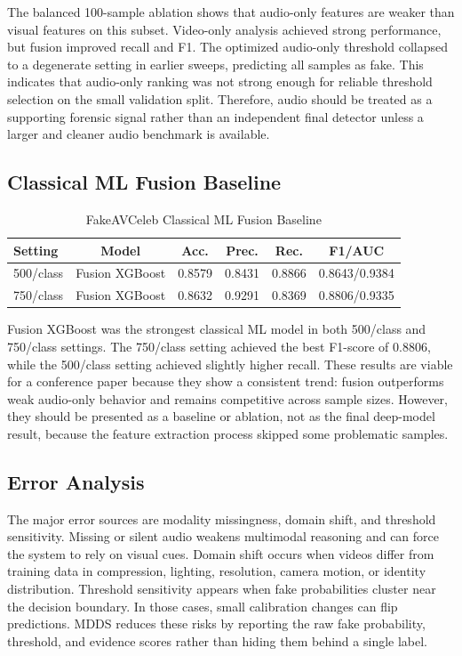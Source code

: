 \documentclass[conference]{IEEEtran}
\begin{document}
The balanced 100-sample ablation shows that audio-only features are weaker than visual features on this subset. Video-only analysis achieved strong performance, but fusion improved recall and F1. The optimized audio-only threshold collapsed to a degenerate setting in earlier sweeps, predicting all samples as fake. This indicates that audio-only ranking was not strong enough for reliable threshold selection on the small validation split. Therefore, audio should be treated as a supporting forensic signal rather than an independent final detector unless a larger and cleaner audio benchmark is available.

\subsection{Classical ML Fusion Baseline}
\begin{table}[htbp]
\caption{FakeAVCeleb Classical ML Fusion Baseline}
\centering
\begin{tabular}{lccccc}
\toprule
Setting & Model & Acc. & Prec. & Rec. & F1/AUC \\
\midrule
500/class & Fusion XGBoost & 0.8579 & 0.8431 & 0.8866 & 0.8643/0.9384 \\
750/class & Fusion XGBoost & 0.8632 & 0.9291 & 0.8369 & 0.8806/0.9335 \\
\bottomrule
\end{tabular}
\end{table}

Fusion XGBoost was the strongest classical ML model in both 500/class and 750/class settings. The 750/class setting achieved the best F1-score of 0.8806, while the 500/class setting achieved slightly higher recall. These results are viable for a conference paper because they show a consistent trend: fusion outperforms weak audio-only behavior and remains competitive across sample sizes. However, they should be presented as a baseline or ablation, not as the final deep-model result, because the feature extraction process skipped some problematic samples.

\subsection{Error Analysis}
The major error sources are modality missingness, domain shift, and threshold sensitivity. Missing or silent audio weakens multimodal reasoning and can force the system to rely on visual cues. Domain shift occurs when videos differ from training data in compression, lighting, resolution, camera motion, or identity distribution. Threshold sensitivity appears when fake probabilities cluster near the decision boundary. In those cases, small calibration changes can flip predictions. MDDS reduces these risks by reporting the raw fake probability, threshold, and evidence scores rather than hiding them behind a single label.
\end{document}
